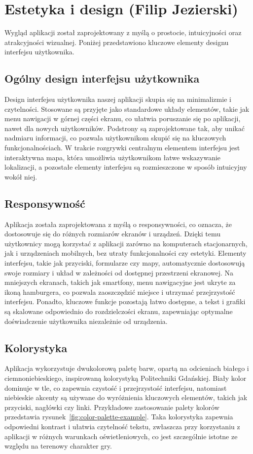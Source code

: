 \section{Estetyka i design (Filip Jezierski) }
Wygląd aplikacji został zaprojektowany z myślą o prostocie, intuicyjności oraz atrakcyjności wizualnej. Poniżej przedstawiono kluczowe elementy designu interfejsu użytkownika.

\subsection{Ogólny design interfejsu użytkownika}
Design interfejsu użytkownika naszej aplikacji skupia się na minimalizmie i czytelności. Stosowane są przyjęte jako standardowe układy elementów, takie jak menu nawigacji w górnej części ekranu, co ułatwia poruszanie się po aplikacji, nawet dla nowych użytkowników. Podstrony są zaprojektowane tak, aby unikać nadmiaru informacji, co pozwala użytkownikom skupić się na kluczowych funkcjonalnościach. W trakcie rozgrywki centralnym elementem interfejsu jest interaktywna mapa, która umożliwia użytkownikom łatwe wskazywanie lokalizacji, a pozostałe elementy interfejsu są rozmieszczone w sposób intuicyjny wokół niej.

\subsection{Responsywność}

Aplikacja została zaprojektowana z myślą o responsywności, co oznacza, że dostosowuje się do różnych rozmiarów ekranów i urządzeń. Dzięki temu użytkownicy mogą korzystać z aplikacji zarówno na komputerach stacjonarnych, jak i urządzeniach mobilnych, bez utraty funkcjonalności czy estetyki. Elementy interfejsu, takie jak przyciski, formularze czy mapy, automatycznie dostosowują swoje rozmiary i układ w zależności od dostępnej przestrzeni ekranowej. Na mniejszych ekranach, takich jak smartfony, menu nawigacyjne jest ukryte za ikoną hamburgera, co pozwala zaoszczędzić miejsce i utrzymać przejrzystość interfejsu. Ponadto, kluczowe funkcje pozostają łatwo dostępne, a tekst i grafiki są skalowane odpowiednio do rozdzielczości ekranu, zapewniając optymalne doświadczenie użytkownika niezależnie od urządzenia.

\subsection{Kolorystyka}
Aplikacja wykorzystuje dwukolorową paletę barw, opartą na odcieniach białego i ciemnoniebieskiego, inspirowaną kolorystyką Politechniki Gdańskiej. Biały kolor dominuje w tle, co zapewnia czystość i przejrzystość interfejsu, natomiast niebieskie akcenty są używane do wyróżnienia kluczowych elementów, takich jak przyciski, nagłówki czy linki. Przykładowe zastosowanie palety kolorów przedstawia rysunek~\ref{fig:color-palette-example}. Taka kolorystyka zapewnia odpowiedni kontrast i ułatwia czytelność tekstu, zwłaszcza przy korzystaniu z aplikacji w różnych warunkach oświetleniowych, co jest szczególnie istotne ze względu na terenowy charakter gry.

